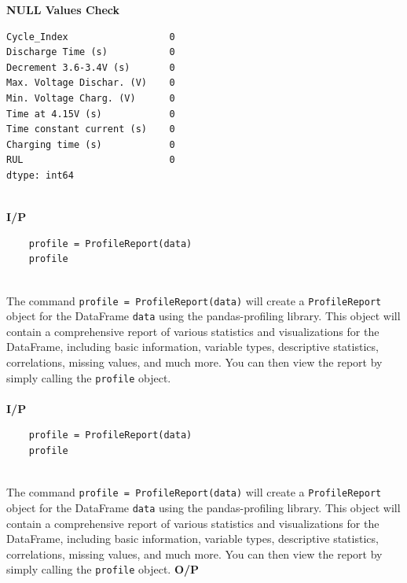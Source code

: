 \noindent
\textbf{NULL Values Check}

\begin{adjustbox}
\footnotesize
\begin{verbatim}
Cycle_Index                  0 
Discharge Time (s)           0 
Decrement 3.6-3.4V (s)       0 
Max. Voltage Dischar. (V)    0 
Min. Voltage Charg. (V)      0 
Time at 4.15V (s)            0 
Time constant current (s)    0 
Charging time (s)            0 
RUL                          0 
dtype: int64 
\end{verbatim}
\end{adjustbox}
\\
\noindent
\textbf{I/P} \\[-1.5em] %

\begin{verbatim}
    profile = ProfileReport(data) 
    profile  
\end{verbatim}
\\
The command \texttt{profile = ProfileReport(data)} will create a \texttt{ProfileReport} object for the DataFrame \texttt{data} using the pandas-profiling library. This object will contain a comprehensive report of various statistics and visualizations for the DataFrame, including basic information, variable types, descriptive statistics, correlations, 
missing values, and much more. You can then view the report by simply calling the \texttt{profile} object.\\
\\
\noindent
\textbf{I/P} \\[-1.5em] %

\begin{verbatim}
    profile = ProfileReport(data) 
    profile  
\end{verbatim}
\\
The command \texttt{profile = ProfileReport(data)} will create a \texttt{ProfileReport} object for the DataFrame \texttt{data} using the pandas-profiling library. This object will contain a comprehensive report of various statistics and visualizations for the DataFrame, including basic information, variable types, descriptive statistics, correlations, missing values, and much more. You can then view the report by simply calling the \texttt{profile} object.
\newpage
\noindent
\textbf{O/P} \\[-1.5em] %

